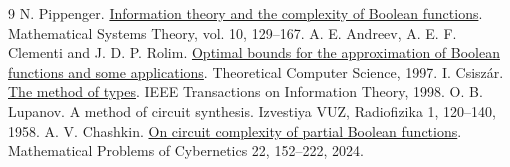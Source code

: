\documentclass[11pt]{article}
\begin{document}
\begin{thebibliography}{9}
 N. Pippenger. \href{https://doi.org/10.1007/BF01683269}{Information theory and the complexity of Boolean functions}. Mathematical Systems Theory, vol. 10, 129--167.
 A. E. Andreev, A. E. F. Clementi and J. D. P. Rolim. \href{https://eccc.weizmann.ac.il/eccc-reports/1995/TR95-041/index.html}{Optimal bounds for the approximation of Boolean functions and some applications}. Theoretical Computer Science, 1997.
 I. Csisz\'ar. \href{https://doi.org/10.1109/18.720546}{The method of types}. IEEE Transactions on Information Theory, 1998.
 O. B. Lupanov. A method of circuit synthesis. Izvestiya VUZ, Radiofizika 1, 120--140, 1958.
 A. V. Chashkin. \href{https://doi.org/10.20948/mvk-2024-152}{On circuit complexity of partial Boolean functions}. Mathematical Problems of Cybernetics 22, 152--222, 2024.
\end{thebibliography}
\end{document}
